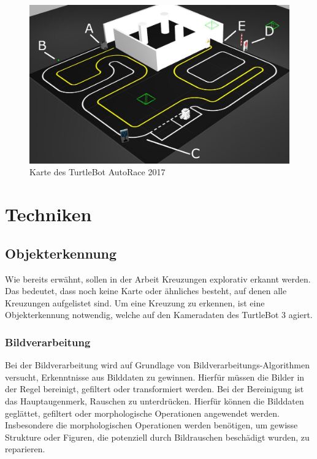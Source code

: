 \begin{figure}[!hbt]
  \centering
  \includegraphics[width=\textwidth]{images/autorace_map.png}
  \caption{Karte des TurtleBot AutoRace 2017}
  \label{fig:Autorace_Map}
\end{figure}

\section{Techniken}
\subsection{Objekterkennung}
Wie bereits erwähnt, sollen in der Arbeit Kreuzungen explorativ erkannt werden. Das bedeutet, dass noch keine Karte oder ähnliches besteht, auf denen alle Kreuzungen aufgelistet sind.
Um eine Kreuzung zu erkennen, ist eine Objekterkennung notwendig, welche auf den Kameradaten des TurtleBot 3 agiert.
\subsubsection{Bildverarbeitung}
Bei der Bildverarbeitung wird auf Grundlage von Bildverarbeitungs-Algorithmen versucht, Erkenntnisse aus Bilddaten zu gewinnen. Hierfür müssen die Bilder in der Regel bereinigt, gefiltert oder transformiert
werden. Bei der Bereinigung ist das Hauptaugenmerk, Rauschen zu unterdrücken. Hierfür können die Bilddaten geglättet, gefiltert oder morphologische Operationen angewendet werden. 
Insbesondere die morphologischen Operationen werden benötigen, um gewisse Strukture oder Figuren, die potenziell durch Bildrauschen beschädigt wurden, zu reparieren.

